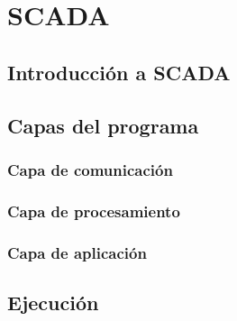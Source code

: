 \chapter{SCADA}
\label{ch:scada}

\section{Introducción a SCADA}
\label{sec:IntroScada}

\section{Capas del programa}
\label{sec:CapasPrograma}

\subsection{Capa de comunicación}
\label{subsec:CapaComunicacion}

\subsection{Capa de procesamiento}
\label{subsec:CapaProcesamiento}

\subsection{Capa de aplicación}
\label{subsec:CapaAplicacion}

\section{Ejecución}
\label{sec:Ejecucion}
